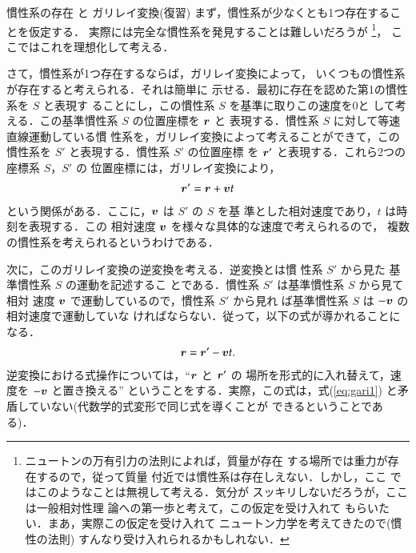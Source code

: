         \begin{memo}{慣性系の存在 と ガリレイ変換(復習)}
            まず，慣性系が少なくとも1つ存在することを仮定する．
            実際には完全な慣性系を発見することは難しいだろうが
                \footnote{
                    ニュートンの万有引力の法則によれば，質量が存在
                    する場所では重力が存在するので，従って質量
                    付近では慣性系は存在しえない．しかし，ここ
                    ではこのようなことは無視して考える．気分が
                    スッキリしないだろうが，ここは一般相対性理
                    論への第一歩と考えて，この仮定を受け入れて
                    もらいたい．まあ，実際この仮定を受け入れて
                    ニュートン力学を考えてきたので(慣性の法則)
                    すんなり受け入れられるかもしれない．
                }，
            ここではこれを理想化して考える．

            さて，慣性系が1つ存在するならば，ガリレイ変換によって，
            いくつもの慣性系が存在すると考えられる．それは簡単に
            示せる．最初に存在を認めた第1の慣性系を $S$ と表現す
            ることにし，この慣性系 $S$ を基準に取りこの速度を0と
            して考える．この基準慣性系 $S$ の位置座標を $\boldsymbol{r}$ と
            表現する．慣性系 $S$ に対して等速直線運動している慣
            性系を，ガリレイ変換によって考えることができて，この
            慣性系を $S'$ と表現する．慣性系 $S'$ の位置座標
            を $\boldsymbol{r}'$ と表現する．これら2つの座標系 $S$，$S'$ の
            位置座標には，ガリレイ変換により，
                \begin{align}\label{eq:gari1}
                    \br' =  \br+\bv t
                \end{align}
            という関係がある．ここに，$\boldsymbol{v}$ は $S'$ の $S$ を基
            準とした相対速度であり，$t$ は時刻を表現する．この
            相対速度 $\boldsymbol{v}$ を様々な具体的な速度で考えられるので，
            複数の慣性系を考えられるというわけである．

            次に，このガリレイ変換の逆変換を考える．逆変換とは慣
            性系 $S'$ から見た 基準慣性系 $S$ の運動を記述するこ
            とである．慣性系 $S'$ は基準慣性系 $S$ から見て相対
            速度 $\boldsymbol{v}$ で運動しているので，慣性系 $S'$ から見れ
            ば基準慣性系 $S$ は $-\boldsymbol{v}$ の相対速度で運動していな
            ければならない．従って，以下の式が導かれることになる．
                \begin{align}
                    \boldsymbol{r} =  \boldsymbol{r}'-\boldsymbol{v} t.
                \end{align}
            逆変換における式操作については，“$\boldsymbol{r}$ と $\boldsymbol{r}'$ の
            場所を形式的に入れ替えて，速度を $-\boldsymbol{v}$ と置き換える”
            ということをする．実際，この式は，式(\ref{eq:gari1})
            と矛盾していない(代数学的式変形で同じ式を導くことが
            できるということである)．
            \end{memo}

